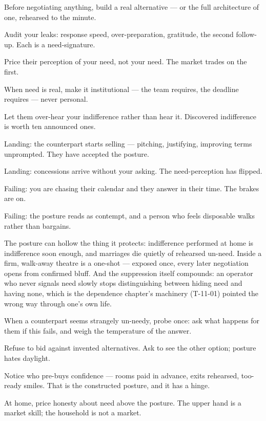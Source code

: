 \begin{application}
  \item Before negotiating anything, build a real alternative --- or the full architecture of one, rehearsed to the minute.
  \item Audit your leaks: response speed, over-preparation, gratitude, the second follow-up. Each is a need-signature.
  \item Price their perception of your need, not your need. The market trades on the first.
  \item When need is real, make it institutional --- the team requires, the deadline requires --- never personal.
  \item Let them over-hear your indifference rather than hear it. Discovered indifference is worth ten announced ones.
\end{application}
\begin{feedback}
  \item Landing: the counterpart starts selling --- pitching, justifying, improving terms unprompted. They have accepted the posture.
  \item Landing: concessions arrive without your asking. The need-perception has flipped.
  \item Failing: you are chasing their calendar and they answer in their time. The brakes are on.
  \item Failing: the posture reads as contempt, and a person who feels disposable walks rather than bargains.
\end{feedback}
\begin{failure}
The posture can hollow the thing it protects: indifference performed at home is indifference soon enough, and marriages die quietly of rehearsed un-need. Inside a firm, walk-away theatre is a one-shot --- exposed once, every later negotiation opens from confirmed bluff. And the suppression itself compounds: an operator who never signals need slowly stops distinguishing between hiding need and having none, which is the dependence chapter's machinery (T-11-01) pointed the wrong way through one's own life.
\end{failure}
\begin{countermeasures}
  \item When a counterpart seems strangely un-needy, probe once: ask what happens for them if this fails, and weigh the temperature of the answer.
  \item Refuse to bid against invented alternatives. Ask to see the other option; posture hates daylight.
  \item Notice who pre-buys confidence --- rooms paid in advance, exits rehearsed, too-ready smiles. That is the constructed posture, and it has a hinge.
  \item At home, price honesty about need above the posture. The upper hand is a market skill; the household is not a market.
\end{countermeasures}

\seesources
{}
